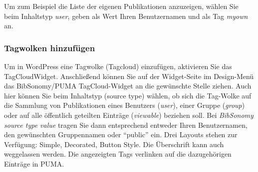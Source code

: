 Um zum Beispiel die Liste der eigenen Publikationen anzuzeigen, wählen Sie beim Inhaltstyp \textit{user}, geben als Wert Ihren Benutzernamen und als Tag \textit{myown} an. 


\subsubsection*{Tagwolken hinzufügen}
\label{sss:wordpressTagcloud}

Um in WordPress eine Tagwolke (Tagcloud) einzufügen, aktivieren Sie das TagCloudWidget. Anschließend können Sie auf der Widget-Seite im Design-Menü das BibSonomy/PUMA TagCloud-Widget an die gewünschte Stelle ziehen. Auch hier können Sie beim Inhaltstyp (source type) wählen, ob sich die Tag-Wolke auf die Sammlung von Publikationen eines Benutzers (\textit{user}), einer Gruppe (\textit{group}) oder auf alle öffentlich geteilten Einträge (\textit{viewable}) beziehen soll. Bei \textit{BibSonomy source type value} tragen Sie dann entsprechend entweder Ihren Benutzernamen, den gewünschten Gruppennamen oder \enquote{public} ein. Drei Layouts stehen zur Verfügung: Simple, Decorated, Button Style. Die Überschrift kann auch weggelassen werden. Die angezeigten Tags verlinken auf die dazugehörigen Einträge in PUMA.


